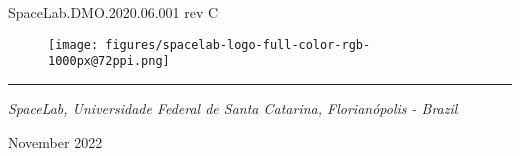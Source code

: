 %
%
%
%
%

%
%
%
%
%
%

\begin{titlepage}

\thispagestyle{empty}

\begin{flushleft}
SpaceLab.DMO.2020.06.001 rev C
\end{flushleft}

\vspace{1cm}

\begin{figure}[!ht]
    \begin{flushleft}
        \texttt{[image: figures/spacelab-logo-full-color-rgb-1000px@72ppi.png]}
    \end{flushleft}
\end{figure}

\begin{flushleft}
\Huge{\textbf{\thetitle}}
\rule[0pt]{\textwidth}{5pt}
\end{flushleft}

\vspace{0.2cm}

\begin{flushleft}
\textit{SpaceLab, Universidade Federal de Santa Catarina, Florianópolis - Brazil}
\end{flushleft}

\vfill
\vfill

\begin{flushright}
November 2022
\end{flushright}

\end{titlepage}
